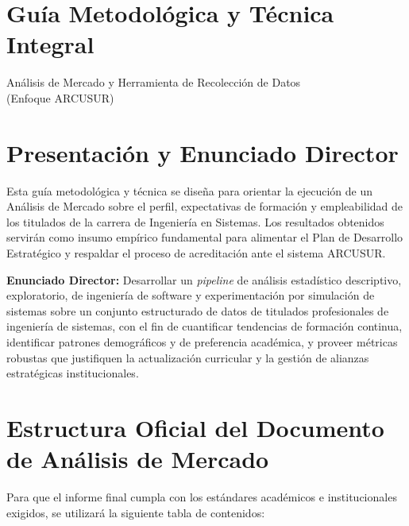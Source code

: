 \documentclass[12pt]{article}
\begin{document}
\section*{Guía Metodológica y Técnica Integral}
\begin{center}
\large Análisis de Mercado y Herramienta de Recolección de Datos\\
(Enfoque ARCUSUR)
\end{center}

\section{Presentación y Enunciado Director}

Esta guía metodológica y técnica se diseña para orientar la ejecución de un
Análisis de Mercado sobre el perfil, expectativas de formación y
empleabilidad de los titulados de la carrera de Ingeniería en Sistemas. Los
resultados obtenidos servirán como insumo empírico fundamental para
alimentar el Plan de Desarrollo Estratégico y respaldar el proceso de
acreditación ante el sistema ARCUSUR.

\textbf{Enunciado Director:} Desarrollar un \emph{pipeline} de análisis
estadístico descriptivo, exploratorio, de ingeniería de software y
experimentación por simulación de sistemas sobre un conjunto estructurado
de datos de titulados profesionales de ingeniería de sistemas, con el fin
de cuantificar tendencias de formación continua, identificar patrones
demográficos y de preferencia académica, y proveer métricas robustas que
justifiquen la actualización curricular y la gestión de alianzas
estratégicas institucionales.

\section{Estructura Oficial del Documento de Análisis de Mercado}

Para que el informe final cumpla con los estándares académicos e
institucionales exigidos, se utilizará la siguiente tabla de contenidos:
\end{document}
